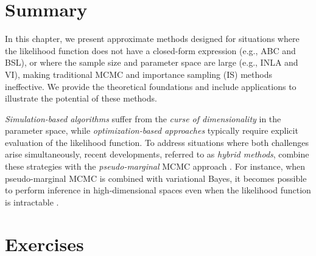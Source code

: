 \section{Summary}\label{sec15_3}
In this chapter, we present approximate methods designed for situations where the likelihood function does not have a closed-form expression (e.g., ABC and BSL), or where the sample size and parameter space are large (e.g., INLA and VI), making traditional MCMC and importance sampling (IS) methods ineffective. We provide the theoretical foundations and include applications to illustrate the potential of these methods.

\textit{Simulation-based algorithms} suffer from the \textit{curse of dimensionality} in the parameter space, while \textit{optimization-based approaches} typically require explicit evaluation of the likelihood function. To address situations where both challenges arise simultaneously, recent developments, referred to as \textit{hybrid methods}, combine these strategies with the \textit{pseudo-marginal} MCMC approach \cite{andrieu2009pseudoefficient, martin2024approximating}. For instance, when pseudo-marginal MCMC is combined with variational Bayes, it becomes possible to perform inference in high-dimensional spaces even when the likelihood function is intractable \cite{tran2017variational}.  

\section{Exercises}\label{sec15_4}

